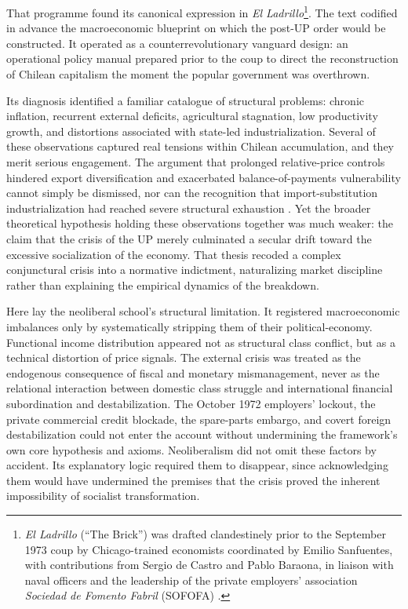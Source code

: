 That programme found its canonical expression in \textit{El Ladrillo}\footnote{\textit{El Ladrillo} (``The Brick'') was drafted clandestinely prior to the September 1973 coup by Chicago-trained 
economists coordinated by Emilio Sanfuentes, with contributions from Sergio de Castro and Pablo Baraona, 
in liaison with naval officers and the leadership of the private employers' association \textit{Sociedad de Fomento Fabril} (SOFOFA)  \citep{DeCastro1992}.}. The text codified in advance the macroeconomic blueprint on which the post-UP order would be constructed. It operated as a counterrevolutionary vanguard design: an 
operational policy manual prepared prior to the coup to direct the reconstruction of Chilean capitalism 
the moment the popular government was overthrown.

Its diagnosis identified a familiar catalogue of structural problems: chronic inflation, 
recurrent external deficits, agricultural stagnation, low productivity growth, and distortions 
associated with state-led industrialization. Several of these observations captured real tensions within 
Chilean accumulation, and they merit serious engagement. The argument that prolonged relative-price 
controls hindered export diversification and exacerbated balance-of-payments vulnerability cannot 
simply be dismissed, nor can the recognition that import-substitution industrialization had reached severe 
structural exhaustion \citep{DeCastro1992}. Yet the broader theoretical hypothesis holding these observations 
together was much weaker: the claim that the crisis of the UP merely culminated a secular drift toward the 
excessive socialization of the economy. That thesis recoded a complex conjunctural crisis into a normative 
indictment, naturalizing market discipline rather than explaining the empirical dynamics of the breakdown.

Here lay the neoliberal school's structural limitation. It registered macroeconomic imbalances 
only by systematically stripping them of their political-economy. Functional income distribution 
appeared not as structural class conflict, but as a technical distortion of price signals. The external 
crisis was treated as the endogenous consequence of fiscal and monetary mismanagement, never as the relational 
interaction between domestic class struggle and international financial subordination and destabilization. The October 1972  employers' lockout, the private commercial credit blockade, the spare-parts embargo, and covert foreign destabilization could not enter the account without undermining the framework's own core hypothesis and axioms. Neoliberalism did not omit these factors by accident. Its explanatory logic required them to disappear, since acknowledging them would have undermined the premises that the crisis proved the inherent impossibility of socialist transformation.

